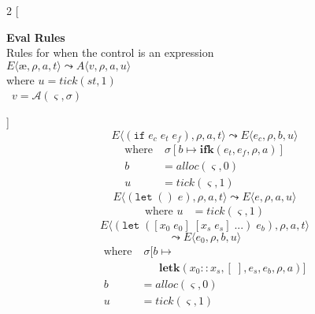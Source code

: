 \documentclass[12pt,draft]{article}
\newcommand\mae{\ensuremath{\text{\ae}}}
\newcommand{\ifsyn}[3]{(\texttt{if}\;#1\;#2\;#3)}
\begin{document}
\begin{multicols*}{2}
[
\begin{center}
\textbf{Eval Rules} \\
Rules for when the control is an expression \\
\vspace{5mm}
$E\langle \mae , \rho , a , t \rangle 
\leadsto 
A\langle v , \rho , a , u \rangle$ \\ 
where $u = tick(st, 1)$ \\
\;\;\;\;\;\, $v = \mathcal{A}(\varsigma, \sigma)$ \\
\vspace{-10mm}
\end{center}
]
\[
E\langle
\ifsyn{e_c}{e_t}{e_f} , \rho , a , t
\rangle
\leadsto
E\langle
e_c , \rho , b , u
\rangle
\]
\vspace{-13mm}
\begin{align*}
\text{where}&\; \sigma[b \mapsto \textbf{ifk}(e_t, e_f, \rho, a)] \\
b &= alloc(\varsigma, 0) \\
u &= tick(\varsigma, 1)
\end{align*}
\vspace{-5mm}
\[
E\langle
(\texttt{let}\;()\;e) , \rho , a , t
\rangle
\leadsto
E\langle
e , \rho , a , u
\rangle
\]
\vspace{-12mm}
\begin{align*}
\text{where } u &= tick(\varsigma, 1)
\end{align*}
\vspace{-5mm}
\[
E\langle
(\texttt{let}\;([x_0\;e_0]\;[x_s\;e_s]\;...)\;e_b) , \rho , a , t
\rangle
\]
\vspace{-7mm}
\[
\leadsto
E\langle
e_{0} , \rho , b , u
\rangle
\]
\vspace{-11mm}
\begin{align*}
\text{where}&\; \sigma[b \mapsto \\
	        &\;\;\;\;\;\;\textbf{letk}(x_0::x_s, [\;], e_s, e_b, \rho, a)] \\
b &= alloc(\varsigma, 0) \\
u &= tick(\varsigma, 1)
\end{align*}
\vspace{-5mm}

\end{multicols*}
\end{document}

